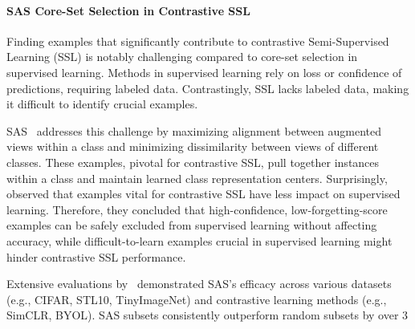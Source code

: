 \paragraph{SAS Core-Set Selection in Contrastive SSL}

Finding examples that significantly contribute to contrastive Semi-Supervised Learning (SSL) is notably challenging compared to core-set selection in supervised learning. Methods in supervised learning rely on loss or confidence of predictions, requiring labeled data. Contrastingly, SSL lacks labeled data, making it difficult to identify crucial examples.

SAS~\cite{pmlr-v202-joshi23b} addresses this challenge by maximizing alignment between augmented views within a class and minimizing dissimilarity between views of different classes. These examples, pivotal for contrastive SSL, pull together instances within a class and maintain learned class representation centers. Surprisingly,~\cite{pmlr-v202-joshi23b} observed that examples vital for contrastive SSL have less impact on supervised learning. Therefore, they concluded that high-confidence, low-forgetting-score examples can be safely excluded from supervised learning without affecting accuracy, while difficult-to-learn examples crucial in supervised learning might hinder contrastive SSL performance.

Extensive evaluations by~\cite{pmlr-v202-joshi23b} demonstrated SAS's efficacy across various datasets (e.g., CIFAR, STL10, TinyImageNet) and contrastive learning methods (e.g., SimCLR, BYOL). SAS subsets consistently outperform random subsets by over 3%
